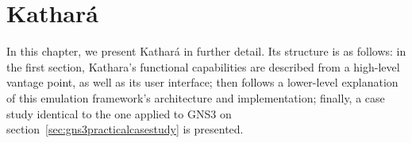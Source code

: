 
\chapter{Kathará}
\label{ch:kathara}

In this chapter, we present Kathará in further detail.
Its structure is as follows: in the first section, Kathara's functional capabilities are described from a high-level vantage point, as well as its user interface; then follows a lower-level explanation of this emulation framework's architecture and implementation; finally, a case study identical to the one applied to GNS3 on section~\ref{sec:gns3practicalcasestudy} is presented.









